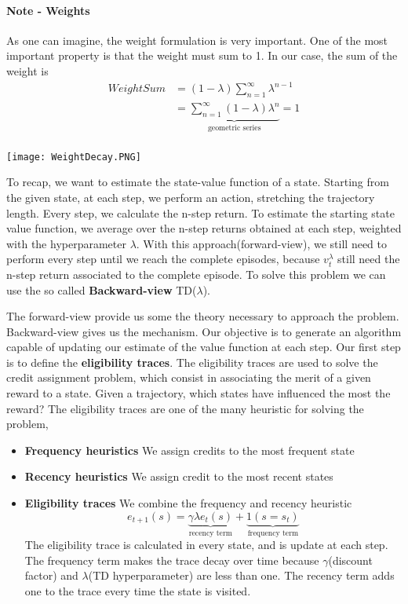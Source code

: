 \documentclass[main.tex]{subfiles}
\begin{document}
\paragraph{Note - Weights} As one can imagine, the weight formulation is very important. One of the most important property is that the weight must sum to 1. In our case, the sum of the weight is
\begin{align*}
    WeightSum &= (1-\lambda) \sum_{n=1}^{\infty} \lambda^{n-1} \\
    &= \underbrace{\sum_{n=1}^{\infty} (1-\lambda) \lambda^n}_{\text{geometric series}} = 1\\
\end{align*}
\begin{center}
    \texttt{[image: WeightDecay.PNG]}
\end{center}
To recap, we want to estimate the state-value function of a state. Starting from the given state, at each step, we perform an action, stretching the trajectory length. Every step, we calculate the n-step return. To estimate the starting state value function, we average over the n-step returns obtained at each step, weighted with the hyperparameter $\lambda$. With this approach(forward-view), we still need to perform every step until we reach the complete episodes, because $v_t^{\lambda}$ still need the n-step return associated to the complete episode. To solve this problem we can use the so called \textbf{Backward-view} TD($\lambda$).
\par
\noindent
The forward-view provide us some the theory necessary to approach the problem. Backward-view gives us the mechanism. Our objective is to generate an algorithm capable of updating our estimate of the value function at each step. Our first step is to define the \textbf{eligibility traces}. The eligibility traces are used to solve the credit assignment problem, which consist in associating the merit of a given reward to a state. Given a trajectory, which states have influenced the most the reward? The eligibility traces are one of the many heuristic for solving the problem,
\begin{itemize}
    \item \textbf{Frequency heuristics} We assign credits to the most frequent state
    \item \textbf{Recency heuristics} We assign credit to the most recent states
    \item \textbf{Eligibility traces} We combine the frequency and recency heuristic\footnotemark {}
    \begin{equation}
        e_{t+1}(s) = \underbrace{\gamma \lambda e_t(s)}_{\text{recency term}} + \underbrace{1(s=s_t)}_{\text{frequency term}}
    \end{equation}
    The eligibility trace is calculated in every state, and is update at each step.
    The frequency term makes the trace decay over time because $\gamma$(discount factor) and $\lambda$(TD hyperparameter) are less than one. The recency term adds one to the trace every time the state is visited. 
\end{itemize}
\end{document}
